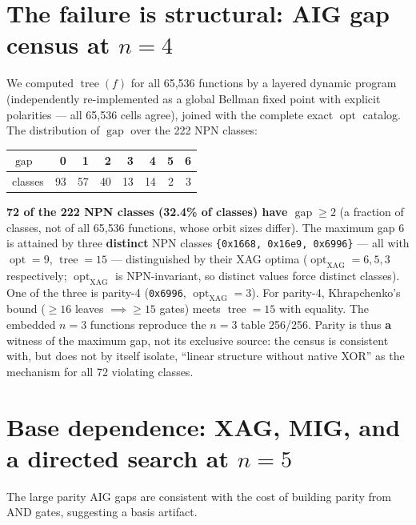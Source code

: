 \documentclass[11pt]{article}
\DeclareMathOperator{\opt}{opt}
\DeclareMathOperator{\tree}{tree}
\DeclareMathOperator{\gapop}{gap}
\newcommand{\optx}{\opt_{\mathrm{XAG}}}
\theoremstyle{plain}
\begin{document}
\section{The failure is structural: AIG gap census at \texorpdfstring{$n = 4$}{n = 4}}
\label{sec:census}

We computed $\tree(f)$ for all 65{,}536 functions by a layered dynamic program (independently
re-implemented as a global Bellman fixed point with explicit polarities --- all 65{,}536 cells
agree), joined with the complete exact $\opt$ catalog. The distribution of $\gapop$ over the 222 NPN
classes:

\begin{table}[h]
\centering
\begin{tabular}{lrrrrrrr}
\toprule
$\gapop$ & 0 & 1 & 2 & 3 & 4 & 5 & 6 \\
\midrule
classes & 93 & 57 & 40 & 13 & 14 & 2 & 3 \\
\bottomrule
\end{tabular}
\end{table}

\noindent
\textbf{72 of the 222 NPN classes (32.4\% of classes) have $\gapop \ge 2$} (a fraction of classes,
not of all 65{,}536 functions, whose orbit sizes differ). The maximum gap 6 is attained by three
\textbf{distinct} NPN classes \texttt{\{0x1668, 0x16e9, 0x6996\}} --- all with $\opt = 9$,
$\tree = 15$ --- distinguished by their XAG optima ($\optx = 6, 5, 3$ respectively; $\optx$ is
NPN-invariant, so distinct values force distinct classes). One of the three is parity-4
(\texttt{0x6996}, $\optx = 3$). For parity-4, Khrapchenko's bound ($\ge 16$ leaves $\implies \ge 15$
gates) meets $\tree = 15$ with equality. The embedded $n = 3$ functions reproduce the $n = 3$ table
256/256. Parity is thus \textbf{a} witness of the maximum gap, not its exclusive source: the census
is consistent with, but does not by itself isolate, ``linear structure without native XOR'' as the
mechanism for all 72 violating classes.

\section{Base dependence: XAG, MIG, and a directed search at \texorpdfstring{$n = 5$}{n = 5}}
\label{sec:basedep}

The large parity AIG gaps are consistent with the cost of building parity from AND gates, suggesting a
basis artifact.
\end{document}
